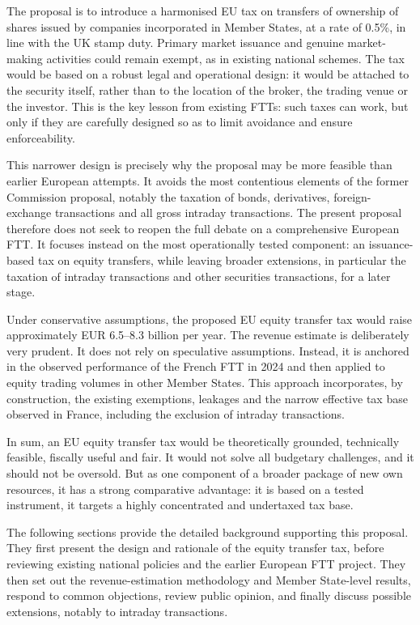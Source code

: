 \documentclass[../../main]{subfiles}
\begin{document}
The proposal is to introduce a harmonised EU tax on transfers of ownership of shares issued by companies incorporated in Member States, at a rate of 0.5\%, in line with the UK stamp duty. Primary market issuance and genuine market-making activities could remain exempt, as in existing national schemes. The tax would be based on a robust legal and operational design: it would be attached to the security itself, rather than to the location of the broker, the trading venue or the investor. This is the key lesson from existing FTTs: such taxes can work, but only if they are carefully designed so as to limit avoidance and ensure enforceability.

This narrower design is precisely why the proposal may be more feasible than earlier European attempts. It avoids the most contentious elements of the former Commission proposal, notably the taxation of bonds, derivatives, foreign-exchange transactions and all gross intraday transactions. The present proposal therefore does not seek to reopen the full debate on a comprehensive European FTT. It focuses instead on the most operationally tested component: an issuance-based tax on equity transfers, while leaving broader extensions, in particular the taxation of intraday transactions and other securities transactions, for a later stage.

Under conservative assumptions, the proposed EU equity transfer tax would raise approximately EUR 6.5--8.3 billion per year. The revenue estimate is deliberately very prudent. It does not rely on speculative assumptions. Instead, it is anchored in the observed performance of the French FTT in 2024 and then applied to equity trading volumes in other Member States. This approach incorporates, by construction, the existing exemptions, leakages and the narrow effective tax base observed in France, including the exclusion of intraday transactions. 

In sum, an EU equity transfer tax would be theoretically grounded, technically feasible, fiscally useful and fair. It would not solve all budgetary challenges, and it should not be oversold. But as one component of a broader package of new own resources, it has a strong comparative advantage: it is based on a tested instrument, it targets a highly concentrated and undertaxed tax base.

The following sections provide the detailed background supporting this proposal. They first present the design and rationale of the equity transfer tax, before reviewing existing national policies and the earlier European FTT project. They then set out the revenue-estimation methodology and Member State-level results, respond to common objections, review public opinion, and finally discuss possible extensions, notably to intraday transactions.
\end{document}
